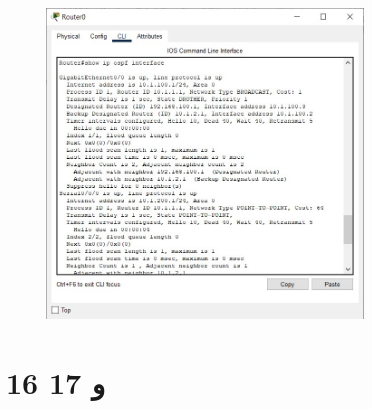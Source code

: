 \documentclass{article}
\begin{document}
\begin{figure}[H]
    \centering
    \includegraphics[width=0.75\textwidth]{figures/23.jpg}
    \caption{}
    \label{fig:fig1}
\end{figure}


\section{16 و 17}%
\end{document}
